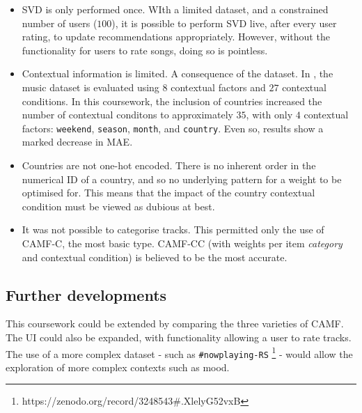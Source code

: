 \documentclass[conference]{IEEEtran}
\begin{document}
\begin{itemize}

\item{SVD is only performed once. WIth a limited dataset, and a constrained number of users ($100$), it is possible to perform SVD live, after every user rating, to update recommendations appropriately. However, without the functionality for users to rate songs, doing so is pointless.}
\item{Contextual information is limited. A consequence of the dataset. In \cite{baltrunas_et_al_2011}, the music dataset is evaluated using $8$ contextual factors and $27$ contextual conditions. In this coursework, the inclusion of countries increased the number of contextual conditons to approximately $35$, with only $4$ contextual factors: \verb|weekend|, \verb|season|, \verb|month|, and \verb|country|. Even so, results show a marked decrease in MAE.}
\item{Countries are not one-hot encoded}. There is no inherent order in the numerical ID of a country, and so no underlying pattern for a weight to be optimised for. This means that the impact of the country contextual condition must be viewed as dubious at best.
\item{It was not possible to categorise tracks}. This permitted only the use of CAMF-C, the most basic type. CAMF-CC (with weights per item \textit{category} and contextual condition) is believed to be the most accurate.

\end{itemize}

\subsection{Further developments}

This coursework could be extended by comparing the three varieties of CAMF. The UI could also be expanded, with functionality allowing a user to rate tracks. The use of a more complex dataset - such as \verb|#nowplaying-RS| \footnote{https://zenodo.org/record/3248543\#.XlelyG52vxB} - would allow the exploration of more complex contexts such as mood.
\end{document}
